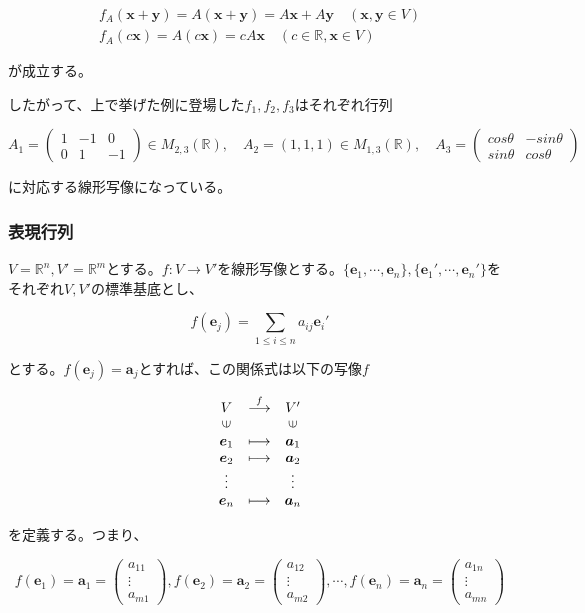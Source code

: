 \documentclass[dvipdfmx,autodetect-engine]{jsarticle}
\theoremstyle{definition}
\newcommand{\vecSpace}[1]{\mathbb{R}^{#1}}
\begin{document}
\begin{eqnarray*}
f_A(\bm{x} + \bm{y}) = A(\bm{x} + \bm{y}) = A\bm{x} + A\bm{y} \quad (\bm{x}, \bm{y} \in V) \\
f_A(c\bm{x}) = A(c\bm{x}) = cA\bm{x} \quad (c \in \mathbb{R}, \bm{x} \in V)
\end{eqnarray*}

が成立する。

したがって、上で挙げた例に登場した$f_1, f_2, f_3$はそれぞれ行列

$$
A_1 = \begin{pmatrix}
1 & -1 & 0 \\
0 & 1 & -1
\end{pmatrix} \in M_{2,3}(\mathbb{R}), \quad
A_2 = (1, 1, 1) \in M_{1,3}(\mathbb{R}), \quad
A_3 = \begin{pmatrix}
cos\theta & -sin\theta \\
sin\theta & cos\theta
\end{pmatrix}
$$

に対応する線形写像になっている。

\subsubsection{表現行列}

$V = \vecSpace{n}, V' = \vecSpace{m}$とする。$f: V \to V'$を線形写像とする。$\{\bm{e}_1, \cdots, \bm{e}_n\}, \{\bm{e}_1', \cdots, \bm{e}_n'\}$をそれぞれ$V, V'$の標準基底とし、

$$
f(\bm{e}_j) = \sum_{1 \leq i \leq n} a_{ij}\bm{e}_{i}'
$$

とする。$f(\bm{e}_j) = \bm{a}_j$とすれば、この関係式は以下の写像$f$

$$
\begin{array}{ccc}
V & \stackrel{f}{\longrightarrow}  & V' \\
\rotatebox{90}{$\in$} & & \rotatebox{90}{$\in$} \\
\bm{e}_1 & \longmapsto & \bm{a}_1 \\
\bm{e}_2 & \longmapsto & \bm{a}_2 \\
\vdots & & \vdots \\
\bm{e}_n & \longmapsto & \bm{a}_n
\end{array}
$$

を定義する。つまり、

$$
f(\bm{e}_1) = \bm{a}_1 = \begin{pmatrix}
a_{11} \\
\vdots \\
a_{m1}
\end{pmatrix}, 
f(\bm{e}_2) = \bm{a}_2 = \begin{pmatrix}
a_{12} \\
\vdots \\
a_{m2}
\end{pmatrix}, 
\cdots,
f(\bm{e}_n) = \bm{a}_n = \begin{pmatrix}
a_{1n} \\
\vdots \\
a_{mn}
\end{pmatrix}
$$
\end{document}
